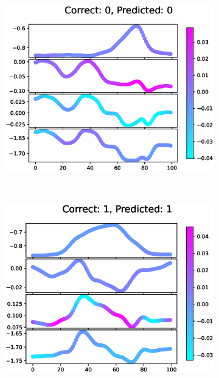 \begin{figure}[h]
  \begin{subfigure}[t]{0.32\textwidth}
    \includegraphics[width=\textwidth]{files/figs/res/femval/gradcam/00.eps}
    \caption{}
    \label{fig:femval-00}
  \end{subfigure}
  ~
  \begin{subfigure}[t]{0.32\textwidth}
    \includegraphics[width=\textwidth]{files/figs/res/femval/gradcam/11.eps}
    \caption{}
    \label{fig:femval-11}
  \end{subfigure}
  ~
  \begin{subfigure}[t]{0.32\textwidth}

\end{subfigure}
\end{figure}
